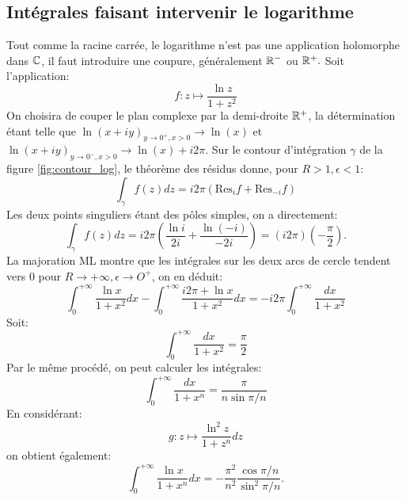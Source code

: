 \subsection{Intégrales faisant intervenir le logarithme}
Tout comme la racine carrée, le logarithme n'est pas une application holomorphe dans $\mathbb{C}$, il faut introduire une coupure, généralement $\mathbb R^-$ ou $\mathbb R^+.$ Soit l'application:
\[
f \colon z \mapsto \frac{\ln{z}}{1+z^2}
\]
On choisira de couper le plan complexe par la demi-droite $\mathbb R^+$, la détermination étant telle que $\ln(x+iy)_{y \to 0^+, x > 0} \to \ln(x)$ et
$\ln(x+iy)_{y \to 0^-, x > 0} \to \ln(x)+i 2 \pi.$ Sur le contour d'intégration $\gamma$ de la figure \ref{fig:contour_log}, le théorème des résidus donne, pour $R> 1, \epsilon < 1$:
\[
\int_\gamma f(z)dz = i2 \pi \left(
\text{Res}_i f + \text{Res}_{-i} f
\right)
\]
Les deux points singuliers étant des pôles simples, on a directement:
\[
\int_\gamma f(z)dz = i2 \pi \left(
\frac{\ln i}{2 i} + \frac{\ln (-i)}{- 2 i} \right)= (i 2 \pi)\left(- \frac{\pi}{2}\right).
\]
La majoration ML montre que les intégrales sur les deux arcs de cercle tendent vers $0$ pour $R \to +\infty, \epsilon \to O^+$, on en déduit:
\[
\int_{0}^{+\infty}\frac{\ln x}{1+x^2}dx - \int_{0}^{+\infty}\frac{i 2 \pi + \ln x}{1+x^2}dx = - i2 \pi \int_{0}^{+\infty}\frac{dx}{1+x^2}
\]
Soit:
\[
\int_{0}^{+\infty}\frac{dx}{1+x^2} = \frac{\pi}{2}
\]
Par le même procédé, on peut calculer les intégrales:
\[
\int_0^{+\infty} \frac{dx}{1 + x^n}=\frac{\pi}{n\sin{\pi/n}}
\]
En considérant:
\[
g\colon z \mapsto \frac{\ln^2 z}{1+z^n}dz
\]
on obtient également:
\[
\int_0^{+\infty} \frac{\ln x}{1 + x^n} dx = -\frac{\pi^2}{n^2}\frac{\cos{\pi/n}}{\sin^2{\pi/n}}.
\]

